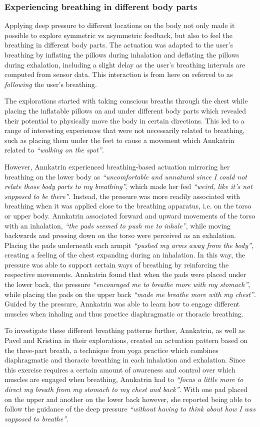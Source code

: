 \subsubsection*{Experiencing breathing in different body parts}
Applying deep pressure to different locations on the body not only made it possible to explore symmetric vs asymmetric feedback, but also to feel the breathing in different body parts. The actuation was adapted to the user's breathing by inflating the pillows during inhalation and deflating the pillows during exhalation, including a slight delay as the user’s breathing intervals are computed from sensor data. This interaction is from here on referred to as \textit{following} the user's breathing.

The explorations started with taking conscious breaths through the chest while placing the inflatable pillows on and under different body parts which revealed their potential to physically move the body in certain directions. This led to a range of interesting experiences that were not necessarily related to breathing, such as placing them under the feet to cause a movement which Annkatrin related to \textit{``walking on the spot''}.

However, Annkatrin experienced breathing-based actuation mirroring her breathing on the lower body as \textit{``uncomfortable and unnatural since I could not relate those body parts to my breathing''}, which made her feel \textit{``weird, like it's not supposed to be there''}. Instead, the pressure was more readily associated with breathing when it was applied close to the breathing apparatus, i.e. on the torso or upper body. Annkatrin associated forward and upward movements of the torso with an inhalation, \textit{``the pads seemed to push me to inhale''}, while moving backwards and pressing down on the torso were perceived as an exhalation. Placing the pads underneath each armpit \textit{``pushed my arms away from the body''}, creating a feeling of the chest expanding during an inhalation. In this way, the pressure was able to support certain ways of breathing by reinforcing the respective movements. Annkatrin found that when the pads were placed under the lower back, the pressure \textit{``encouraged me to breathe more with my stomach''}, while placing the pads on the upper back \textit{``made me breathe more with my chest''}. Guided by the pressure, Annkatrin was able to learn how to engage different muscles when inhaling and thus practice diaphragmatic or thoracic breathing.

To investigate these different breathing patterns further, Annkatrin, as well as Pavel and Kristina in their explorations, created an actuation pattern based on the three-part breath, a technique from yoga practice which combines diaphragmatic and thoracic breathing in each inhalation and exhalation. Since this exercise requires a certain amount of awareness and control over which muscles are engaged when breathing, Annkatrin had to \textit{``focus a little more to direct my breath from my stomach to my chest and back''}. With one pad placed on the upper and another on the lower back however, she reported being able to follow the guidance of the deep pressure \textit{``without having to think about how I was supposed to breathe''}.

